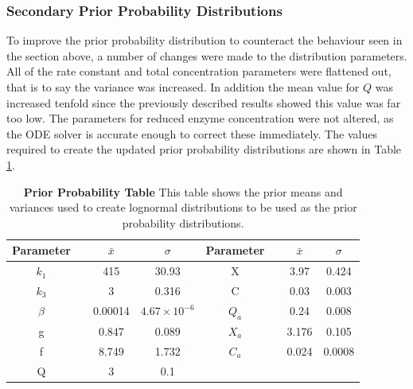 
\subsubsection{Secondary Prior Probability Distributions}
To improve the prior probability distribution to counteract the behaviour seen in the section above, a number of changes were made to the distribution parameters. All of the rate constant and total concentration parameters were flattened out, that is to say the variance was increased. In addition the mean value for $Q$ was increased tenfold since the previously described results showed this value was far too low. The parameters for reduced enzyme concentration were not altered, as the ODE solver is accurate enough to correct these immediately. The values required to create the updated prior probability distributions are shown in Table \ref{tab:oxyProbstat1}.
\begin{table}[h]%
\renewcommand{\arraystretch}{1.5}
\begin{center}
\begin{tabular}{cccc|cccc}
\toprule
\textbf{Parameter} && ${\bar{x}}$ & $\sigma$ & \textbf{Parameter} && ${\bar{x}}$ & $\sigma$\\
\midrule
$k_1$ && 415 & 30.93 & X && 3.97 & 0.424\\
$k_3$ && 3 & 0.316 & C && 0.03 & 0.003\\
$\beta$ && 0.00014 & $4.67\times 10^{-6}$ & $Q_a$ && 0.24 & 0.008\\
g && 0.847 & 0.089 & $X_a$ && 3.176 & 0.105\\
f && 8.749 & 1.732 & $C_a$ && 0.024 & 0.0008\\
Q && 3 & 0.1\\
\bottomrule
\end{tabular}
\end{center}
\caption[Second Prior Probability Table]{{\bf Prior Probability Table} This table shows the prior means and variances used to create lognormal distributions to be used as the prior probability distributions.
\label{tab:oxyProbstat1}}
\end{table}
